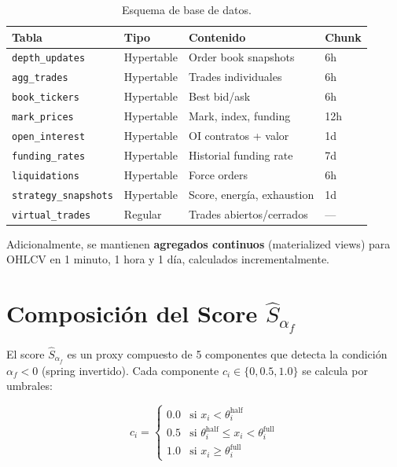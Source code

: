 \documentclass[11pt,a4paper]{article}
\newcommand{\af}{\alpha_f}
\newcommand{\score}{\hat{S}_{\alpha_f}}
\newcommand{\code}[1]{\texttt{\small #1}}
\begin{document}
\begin{table}[H]
\centering
\caption{Esquema de base de datos.}
\label{tab:schema}
\begin{tabularx}{\textwidth}{llXl}
\toprule
\textbf{Tabla} & \textbf{Tipo} & \textbf{Contenido} & \textbf{Chunk} \\
\midrule
\code{depth\_updates} & Hypertable & Order book snapshots & 6h \\
\code{agg\_trades} & Hypertable & Trades individuales & 6h \\
\code{book\_tickers} & Hypertable & Best bid/ask & 6h \\
\code{mark\_prices} & Hypertable & Mark, index, funding & 12h \\
\code{open\_interest} & Hypertable & OI contratos + valor & 1d \\
\code{funding\_rates} & Hypertable & Historial funding rate & 7d \\
\code{liquidations} & Hypertable & Force orders & 6h \\
\code{strategy\_snapshots} & Hypertable & Score, energ\'ia, exhaustion & 1d \\
\code{virtual\_trades} & Regular & Trades abiertos/cerrados & --- \\
\bottomrule
\end{tabularx}
\end{table}

Adicionalmente, se mantienen \textbf{agregados continuos} (materialized views)
para OHLCV en 1 minuto, 1 hora y 1 d\'ia, calculados incrementalmente.


\section{Composici\'on del Score $\score$}
\label{sec:score}

El score $\score$ es un proxy compuesto de 5 componentes que detecta la
condici\'on $\af < 0$ (spring invertido). Cada componente $c_i \in \{0, 0.5, 1.0\}$
se calcula por umbrales:

\begin{equation}
c_i = \begin{cases}
0.0 & \text{si } x_i < \theta_i^{\text{half}} \\
0.5 & \text{si } \theta_i^{\text{half}} \leq x_i < \theta_i^{\text{full}} \\
1.0 & \text{si } x_i \geq \theta_i^{\text{full}}
\end{cases}
\label{eq:component}
\end{equation}
\end{document}
